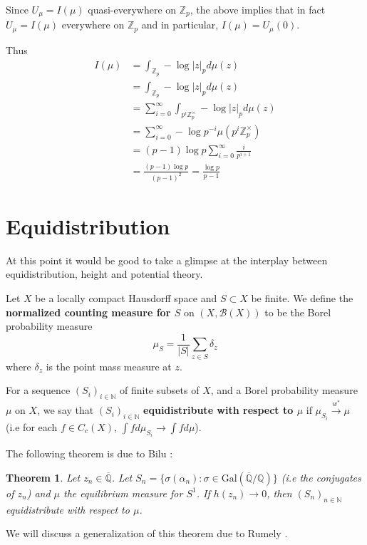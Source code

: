 \documentclass{amsart}
\newtheorem{thm}{Theorem}[section]
\newcommand{\N}{\mathbb{N}}
\newcommand{\Z}{\mathbb{Z}}
\newcommand{\Q}{\mathbb{Q}}
\newcommand{\MCB}{\mathcal{B}}
\newcommand{\ol}{\overline}
\begin{document}
Since $U_{\mu} = I(\mu)$ quasi-everywhere on $\Z_p$, the above implies that in fact $U_{\mu} = I(\mu)$ everywhere on $\Z_p$ and in particular, $I(\mu) = U_{\mu}(0)$.

Thus 
\begin{align*}
I(\mu) 
&= \int_{\Z_p}-\log|z|_pd\mu(z)\\
&= \int_{\Z_p}-\log|z|_pd\mu(z)\\
&= \sum_{i=0}^{\infty} \int_{p^i\Z_p^{\times}}-\log|z|_p d\mu(z)\\
&= \sum_{i=0}^{\infty}-\log p^{-i} \mu(p^i\Z_p^{\times})\\
&= (p-1)\log p \sum_{i=0}^{\infty}\frac{i}{p^{i+1}}\\
&= \frac{(p-1)  \log p}{(p-1)^2} = \frac{\log p}{p-1} 
\end{align*}  

\section{Equidistribution}

At this point it would be good to take a glimpse at the interplay between equidistribution, height and potential theory. 

Let $X$ be a locally compact Hausdorff space and $S \subset X $ be finite. We define the \textbf{normalized counting measure for $S$} on $(X, \MCB(X))$ to be the Borel probability measure $$\mu_S = \frac{1}{|S|}\sum\limits_{z \in S} \delta_z$$ where $\delta_z$ is the point mass measure at $z$. \

For a sequence $(S_i)_{i \in \N}$ of finite subsets of $X$, and a Borel probability measure $\mu$ on $X$, we say that $(S_i)_{i \in \N}$   \textbf{equidistribute with respect to $\mu$} if $\mu_{S_i} \xrightarrow{w^*} \mu$ (i.e for each $f \in C_c(X)$, $\int f d\mu_{S_i} \rightarrow \int f d\mu$).

The following theorem is due to Bilu \cite{Bilu}:

\begin{thm}

Let $z_n \in \overline{\Q}$. Let $S_n = \{\sigma(\alpha_n): \sigma \in \mathrm{Gal}(\ol{ \Q }/ \Q )\}$ (i.e the conjugates of $z_n$) and $\mu$ the equilibrium measure for $S^1$. If $h(z_n) \rightarrow 0$, then $(S_n)_{n \in \N}$ equidistribute with respect to $\mu$.  

\end{thm}
 
We will discuss a generalization of this theorem due to Rumely \cite{R}. 
\end{document}
